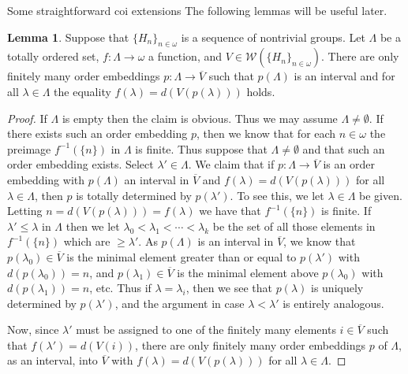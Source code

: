 \documentclass{amsart}
\theoremstyle{definition}\newtheorem{theorem}{Theorem}
\theoremstyle{definition}\newtheorem*{A}{Main Theorem}
\theoremstyle{definition}\newtheorem*{B}{Theorem \ref{elementaryequiv}}
\theoremstyle{definition}\newtheorem*{C}{Theorem \ref{continuous}}
\theoremstyle{definition}\newtheorem*{D}{Theorem \ref{bigisomorphism2}}
\theoremstyle{definition}\newtheorem{bigtheorem}{Main Theorem}
\numberwithin{theorem}{section}
\theoremstyle{definition}\newtheorem{corollary}[theorem]{Corollary}
\theoremstyle{definition}\newtheorem{proposition}[theorem]{Proposition}
\theoremstyle{definition}\newtheorem{definition}[theorem]{Definition}
\theoremstyle{definition}\newtheorem{question}[theorem]{Question}
\theoremstyle{definition}\newtheorem{example}[theorem]{Example}
\theoremstyle{definition}\newtheorem{remark}[theorem]{Remark}
\theoremstyle{definition}\newtheorem{note}[theorem]{Note}
\theoremstyle{definition}\newtheorem{lemma}[theorem]{Lemma}
\theoremstyle{definition}\newtheorem{fact}[theorem]{Fact}
\theoremstyle{definition}\newtheorem{define}[theorem]{Definition}
\theoremstyle{definition}\newtheorem{claim}[theorem]{Claim}
\theoremstyle{definition}\newtheorem{obs}[theorem]{Observation}
\theoremstyle{definition}\newtheorem{definitions}[theorem]{Definitions}
\newcommand{\W}{\mathcal{W}}
\begin{document}
\begin{section}{Some straightforward coi extensions}
The following lemmas will be useful later.

\begin{lemma}\label{newword1}  Suppose that $\{H_n\}_{n \in \omega}$ is a sequence of nontrivial groups.  Let $\Lambda$ be a totally ordered set, $f: \Lambda \rightarrow \omega$ a function, and $V \in \W(\{H_n\}_{n \in \omega})$.  There are only finitely many order embeddings $p: \Lambda \rightarrow \overline{V}$ such that $p(\Lambda)$ is an interval and for all $\lambda \in \Lambda$ the equality $f(\lambda) = d(V(p(\lambda)))$ holds.
\end{lemma}

\begin{proof}  If $\Lambda$ is empty then the claim is obvious.  Thus we may assume $\Lambda \neq \emptyset$.  If there exists such an order embedding $p$, then we know that for each $n \in \omega$ the preimage $f^{-1}(\{n\})$ in $\Lambda$ is finite.  Thus suppose that $\Lambda \neq \emptyset$ and that such an order embedding exists.  Select $\lambda' \in \Lambda$.  We claim that if $p: \Lambda \rightarrow \overline{V}$ is an order embedding with $p(\Lambda)$ an interval in $\overline{V}$ and $f(\lambda) = d(V(p(\lambda)))$ for all $\lambda \in \Lambda$, then $p$ is totally determined by $p(\lambda')$.  To see this, we let $\lambda \in \Lambda$ be given.  Letting $n = d(V(p(\lambda))) = f(\lambda)$ we have that $f^{-1}(\{n\})$ is finite.  If $\lambda' \leq \lambda$ in $\Lambda$ then we let $\lambda_0 < \lambda_1 < \cdots < \lambda_k$ be the set of all those elements in $f^{-1}(\{n\})$ which are $\geq \lambda'$.  As $p(\Lambda)$ is an interval in $\overline{V}$, we know that $p(\lambda_0) \in \overline{V}$ is the minimal element greater than or equal to $p(\lambda')$ with $d(p(\lambda_0)) = n$, and $p(\lambda_1) \in \overline{V}$ is the minimal element above $p(\lambda_0)$ with $d(p(\lambda_1)) = n$, etc.  Thus if $\lambda = \lambda_i$, then we see that $p(\lambda)$ is uniquely determined by $p(\lambda')$, and the argument in case $\lambda < \lambda'$ is entirely analogous.

Now, since $\lambda'$ must be assigned to one of the finitely many elements $i \in \overline{V}$ such that $f(\lambda') = d(V(i))$, there are only finitely many order embeddings $p$ of $\Lambda$, as an interval, into $\overline{V}$ with $f(\lambda) = d(V(p(\lambda)))$ for all $\lambda \in \Lambda$.

\end{proof}




\end{section}
\end{document}
